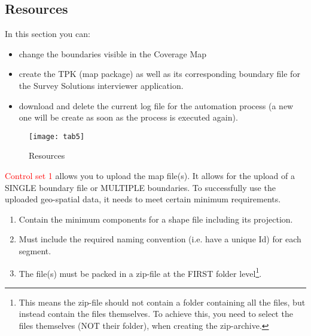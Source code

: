 \documentclass[a4paper]{article}
\providecommand{\tightlist}{%
  \setlength{\itemsep}{0pt}\setlength{\parskip}{0pt}}
\begin{document}
\hypertarget{resources}{%
\subsection{Resources}\label{resources}}

In this section you can:

\begin{itemize}
\tightlist
\item
  change the boundaries visible in the Coverage Map
\item
  create the TPK (map package) as well as its corresponding boundary file for the Survey Solutions interviewer application.
\item
  download and delete the current log file for the automation process (a new one will be create as soon as the process is executed again).
\end{itemize}

\begin{figure}

{\centering \texttt{[image: tab5]} 

}

\caption{Resources}\label{fig:tab5}
\end{figure}

\textcolor{red}{Control set 1} allows you to upload the map file(s). It allows for the upload of a SINGLE boundary file or MULTIPLE boundaries. To successfully use the uploaded geo-spatial data, it needs to meet certain minimum requirements.

\begin{tcolorbox}[colback=cyan!5,colframe=cyan!40!black,title=Requirements for area boundaries:]
\begin{enumerate}
    \item Contain the minimum components for a shape file including its projection.
    \item Must include the required naming convention (i.e. have a unique Id) for each segment.
    \item The file(s) must be packed in a zip-file at the FIRST folder level\footnote{This means the zip-file should not contain a folder containing all the files, but instead contain the files themselves. To achieve this, you need to select the files themselves (NOT their folder), when creating the zip-archive.}.
\end{enumerate}
\end{tcolorbox}
\end{document}
